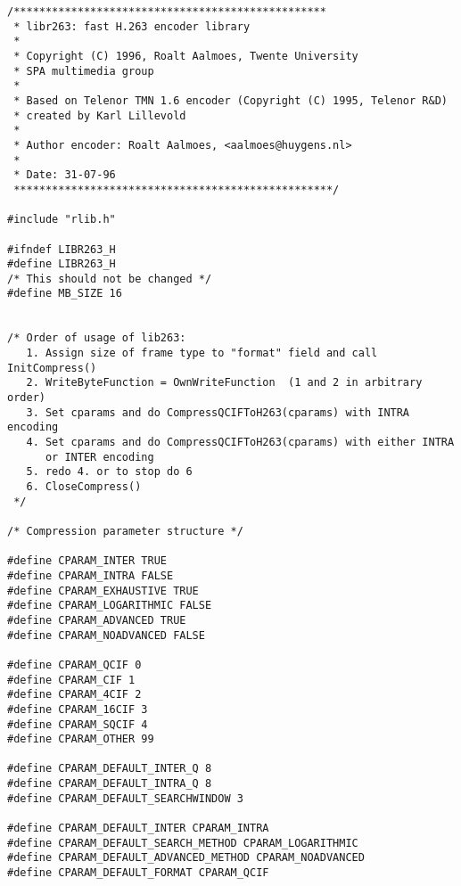 \documentclass{article}
\begin{document}
\begin{verbatim}
/*************************************************
 * libr263: fast H.263 encoder library
 *
 * Copyright (C) 1996, Roalt Aalmoes, Twente University
 * SPA multimedia group
 *
 * Based on Telenor TMN 1.6 encoder (Copyright (C) 1995, Telenor R&D)
 * created by Karl Lillevold 
 *
 * Author encoder: Roalt Aalmoes, <aalmoes@huygens.nl>
 * 
 * Date: 31-07-96
 **************************************************/

#include "rlib.h"

#ifndef LIBR263_H
#define LIBR263_H
/* This should not be changed */
#define MB_SIZE 16


/* Order of usage of lib263:
   1. Assign size of frame type to "format" field and call InitCompress()
   2. WriteByteFunction = OwnWriteFunction  (1 and 2 in arbitrary order)
   3. Set cparams and do CompressQCIFToH263(cparams) with INTRA encoding
   4. Set cparams and do CompressQCIFToH263(cparams) with either INTRA 
      or INTER encoding
   5. redo 4. or to stop do 6
   6. CloseCompress()
 */

/* Compression parameter structure */

#define CPARAM_INTER TRUE
#define CPARAM_INTRA FALSE
#define CPARAM_EXHAUSTIVE TRUE
#define CPARAM_LOGARITHMIC FALSE
#define CPARAM_ADVANCED TRUE
#define CPARAM_NOADVANCED FALSE

#define CPARAM_QCIF 0
#define CPARAM_CIF 1
#define CPARAM_4CIF 2
#define CPARAM_16CIF 3
#define CPARAM_SQCIF 4
#define CPARAM_OTHER 99

#define CPARAM_DEFAULT_INTER_Q 8
#define CPARAM_DEFAULT_INTRA_Q 8
#define CPARAM_DEFAULT_SEARCHWINDOW 3

#define CPARAM_DEFAULT_INTER CPARAM_INTRA
#define CPARAM_DEFAULT_SEARCH_METHOD CPARAM_LOGARITHMIC
#define CPARAM_DEFAULT_ADVANCED_METHOD CPARAM_NOADVANCED
#define CPARAM_DEFAULT_FORMAT CPARAM_QCIF


\end{verbatim}
\end{document}
